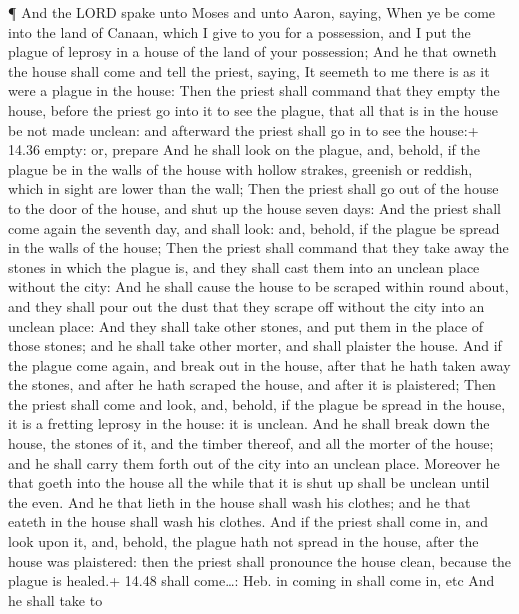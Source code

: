  ¶ And the LORD spake unto Moses and unto Aaron, saying,
 When ye be come into the land of Canaan, which I give to
you for a possession, and I put the plague of leprosy in a house of the
land of your possession;  And he that owneth the house
shall come and tell the priest, saying, It seemeth to me there is as it
were a plague in the house:  Then the priest shall command
that they empty the house, before the priest go into it to see the
plague, that all that is in the house be not made unclean: and afterward
the priest shall go in to see the house:+ 14.36 empty: or, prepare
 And he shall look on the plague, and, behold, if the
plague be in the walls of the house with hollow strakes, greenish or
reddish, which in sight are lower than the wall;  Then the
priest shall go out of the house to the door of the house, and shut up
the house seven days:  And the priest shall come again the
seventh day, and shall look: and, behold, if the plague be spread in the
walls of the house;  Then the priest shall command that
they take away the stones in which the plague is, and they shall cast
them into an unclean place without the city:  And he shall
cause the house to be scraped within round about, and they shall pour
out the dust that they scrape off without the city into an unclean
place:  And they shall take other stones, and put them in
the place of those stones; and he shall take other morter, and shall
plaister the house.  And if the plague come again, and
break out in the house, after that he hath taken away the stones, and
after he hath scraped the house, and after it is plaistered;
 Then the priest shall come and look, and, behold, if the
plague be spread in the house, it is a fretting leprosy in the house: it
is unclean.  And he shall break down the house, the stones
of it, and the timber thereof, and all the morter of the house; and he
shall carry them forth out of the city into an unclean place.
 Moreover he that goeth into the house all the while that
it is shut up shall be unclean until the even.  And he that
lieth in the house shall wash his clothes; and he that eateth in the
house shall wash his clothes.  And if the priest shall come
in, and look upon it, and, behold, the plague hath not spread in the
house, after the house was plaistered: then the priest shall pronounce
the house clean, because the plague is healed.+ 14.48 shall come\ldots:
Heb. in coming in shall come in, etc  And he shall take to
